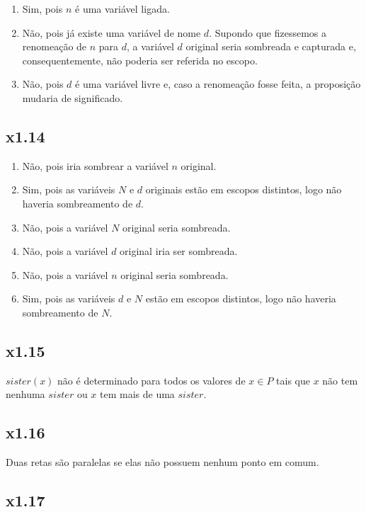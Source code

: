 \documentclass[portuguese,a4paper,12pt]{article}
\begin{document}
	\begin{enumerate}[label=(\roman*)]
		\item Sim, pois $n$ é uma variável ligada.
		\item Não, pois já existe uma variável de nome $d$. Supondo que fizessemos a renomeação de $n$ para $d$, a variável $d$ original seria sombreada e capturada e, consequentemente, não poderia ser referida no escopo.
		\item Não, pois $d$ é uma variável livre e, caso a renomeação fosse feita, a proposição mudaria de significado.
	\end{enumerate}
	
	\subsection*{x1.14}
	
	\begin{enumerate}[label=(\roman*)]
		\item Não, pois iria sombrear a variável $n$ original.
		\item Sim, pois as variáveis $N$ e $d$ originais estão em escopos distintos, logo não haveria sombreamento de $d$.
		\item Não, pois a variável $N$ original seria sombreada.
		\item Não, pois a variável $d$ original iria ser sombreada.
		\item Não, pois a variável $n$ original seria sombreada.
		\item Sim, pois as variáveis $d$ e $N$ estão em escopos distintos, logo não haveria sombreamento de $N$.
	\end{enumerate}
	
	\subsection*{x1.15}
	
	$sister(x)$ não é determinado para todos os valores de $x \in P$ tais que $x$ não tem nenhuma $sister$ ou $x$ tem mais de uma $sister$.
	
	\subsection*{x1.16}
	
	Duas retas são paralelas se elas não possuem nenhum ponto em comum.
	
	\subsection*{x1.17}
	
\end{document}
